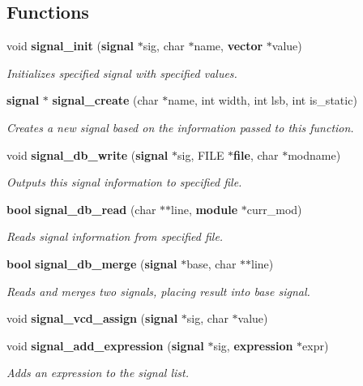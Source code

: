 \subsection*{Functions}
\begin{CompactItemize}
\item 
void {\bf signal\_\-init} ({\bf signal} $\ast$sig, char $\ast$name, {\bf vector} $\ast$value)
\begin{CompactList}\small\item\em Initializes specified signal with specified values.\item\end{CompactList}\item 
{\bf signal} $\ast$ {\bf signal\_\-create} (char $\ast$name, int width, int lsb, int is\_\-static)
\begin{CompactList}\small\item\em Creates a new signal based on the information passed to this function.\item\end{CompactList}\item 
void {\bf signal\_\-db\_\-write} ({\bf signal} $\ast$sig, FILE $\ast${\bf file}, char $\ast$modname)
\begin{CompactList}\small\item\em Outputs this signal information to specified file.\item\end{CompactList}\item 
{\bf bool} {\bf signal\_\-db\_\-read} (char $\ast$$\ast$line, {\bf module} $\ast$curr\_\-mod)
\begin{CompactList}\small\item\em Reads signal information from specified file.\item\end{CompactList}\item 
{\bf bool} {\bf signal\_\-db\_\-merge} ({\bf signal} $\ast$base, char $\ast$$\ast$line)
\begin{CompactList}\small\item\em Reads and merges two signals, placing result into base signal.\item\end{CompactList}\item 
void {\bf signal\_\-vcd\_\-assign} ({\bf signal} $\ast$sig, char $\ast$value)
\item 
void {\bf signal\_\-add\_\-expression} ({\bf signal} $\ast$sig, {\bf expression} $\ast$expr)
\begin{CompactList}\small\item\em Adds an expression to the signal list.\item\end{CompactList}\item 

\end{CompactItemize}

